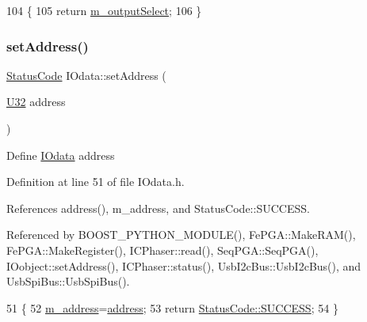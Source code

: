 \begin{DoxyCode}
104                     \{
105     \textcolor{keywordflow}{return} \hyperlink{classIOdata_acc46d71243b542e68277e242effa7f1b}{m\_outputSelect};
106   \}
\end{DoxyCode}
\mbox{\label{classIOdata_af98cbfbc28346ebb9b64ca0203af1463}} 
\subsubsection{\texorpdfstring{set\+Address()}{setAddress()}}
{\footnotesize\ttfamily \hyperlink{classStatusCode}{Status\+Code} I\+Odata\+::set\+Address (\begin{DoxyParamCaption}\item[{\hyperlink{classIOdata_a96fb57f5fcd87b708743abd3c86a5198}{U32}}]{address }\end{DoxyParamCaption})\hspace{0.3cm}{\ttfamily [inline]}}

Define \hyperlink{classIOdata}{I\+Odata} address 

Definition at line 51 of file I\+Odata.\+h.



References address(), m\+\_\+address, and Status\+Code\+::\+S\+U\+C\+C\+E\+SS.



Referenced by B\+O\+O\+S\+T\+\_\+\+P\+Y\+T\+H\+O\+N\+\_\+\+M\+O\+D\+U\+L\+E(), Fe\+P\+G\+A\+::\+Make\+R\+A\+M(), Fe\+P\+G\+A\+::\+Make\+Register(), I\+C\+Phaser\+::read(), Seq\+P\+G\+A\+::\+Seq\+P\+G\+A(), I\+Oobject\+::set\+Address(), I\+C\+Phaser\+::status(), Usb\+I2c\+Bus\+::\+Usb\+I2c\+Bus(), and Usb\+Spi\+Bus\+::\+Usb\+Spi\+Bus().


\begin{DoxyCode}
51                                     \{
52     \hyperlink{classIOdata_a965810e1888b904c575277f50cea734a}{m\_address}=\hyperlink{classIOdata_afe410c86881b8c2082a08e5ce9843306}{address};
53     \textcolor{keywordflow}{return} \hyperlink{classStatusCode_a6f565cbeadc76d14c72f047e5e85eb4badd0da38d3ba0d922efd1f4619bc37ad8}{StatusCode::SUCCESS};
54   \}
\end{DoxyCode}
\mbox{\label{classIOdata_a334f07d85e3dc8069551dcd8ab942e9c}} 
